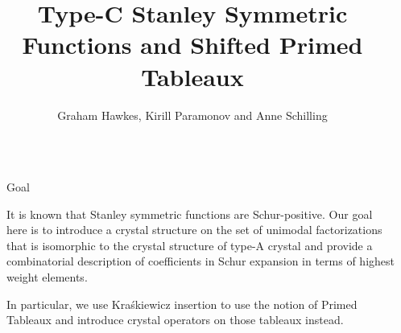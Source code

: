\documentclass[final]{beamer}
\title{Type-C Stanley Symmetric Functions and Shifted Primed Tableaux} %
\author{Graham Hawkes, Kirill Paramonov and Anne Schilling} %
\institute{University of California, Davis} %
\newlength{\sepwid}
\newlength{\onecolwid}
\newlength{\twocolwid}
\begin{document}

\setlength{\belowcaptionskip}{2ex} %
\setlength\belowdisplayshortskip{2ex} %

\begin{frame}[t] %

\begin{columns}[t] %

\begin{column}{\sepwid}\end{column} %

\begin{column}{\twocolwid}\vspace{-.4in} %


\begin{alertblock}{Goal}

It is known that Stanley symmetric functions are Schur-positive. Our goal here is to introduce a crystal structure on the set of unimodal factorizations that is isomorphic to the crystal structure of type-A crystal and provide a combinatorial description of coefficients in Schur expansion in terms of highest weight elements.

In particular, we use Kra\'skiewicz insertion to use the notion of Primed Tableaux and introduce crystal operators on those tableaux instead.

\end{alertblock}



\begin{columns}[t]

\begin{column}{\onecolwid}\vspace{-.8in}



\end{column}
\end{columns}
\end{column}
\end{columns}
\end{frame}
\end{document}
